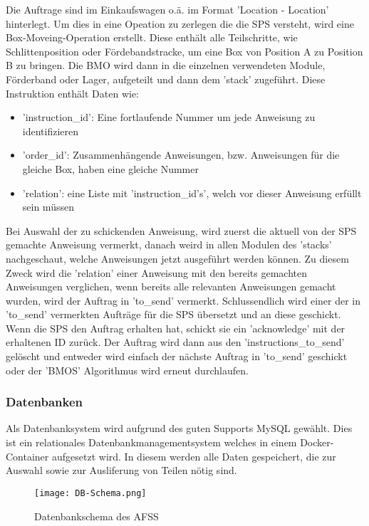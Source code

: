 Die Auftrage sind im Einkaufswagen o.ä. im Format 'Location -\> Location' hinterlegt. Um dies in eine Opeation zu zerlegen die die SPS versteht, wird eine Box-Moveing-Operation erstellt. Diese enthält alle Teilschritte, wie Schlittenposition oder Fördebandstracke, um eine Box von Position A zu Position B zu bringen. 
Die BMO wird dann in die einzelnen verwendeten Module, Förderband oder Lager, aufgeteilt und dann dem 'stack' zugeführt. Diese Instruktion enthält Daten wie:
\begin{itemize}
    \item 'instruction\_id': Eine fortlaufende Nummer um jede Anweisung zu identifizieren
    \item 'order\_id': Zusammenhängende Anweisungen, bzw. Anweisungen für die gleiche Box, haben eine gleiche Nummer
    \item 'relation': eine Liste mit 'instruction\_id's', welch vor dieser Anweisung erfüllt sein müssen
\end{itemize} 

Bei Auswahl der zu schickenden Anweisung, wird zuerst die aktuell von der SPS gemachte Anweisung vermerkt, danach weird in allen Modulen des 'stacks' nachgeschaut, welche Anweisungen jetzt ausgeführt werden können. Zu diesem Zweck wird die 'relation' einer Anweisung mit den bereits gemachten Anweisungen verglichen, wenn bereits alle relevanten Anweisungen gemacht wurden, wird der Auftrag in 'to\_send' vermerkt. Schlussendlich wird einer der in 'to\_send' vermerkten Aufträge für die SPS übersetzt und an diese geschickt. 
Wenn die SPS den Auftrag erhalten hat, schickt sie ein 'acknowledge' mit der erhaltenen ID zurück. Der Auftrag wird dann aus den 'instructions\_to\_send' gelöscht und entweder wird einfach der nächste Auftrag in 'to\_send' geschickt oder der 'BMOS' Algorithmus wird erneut durchlaufen.


\subsubsection{Datenbanken}

Als Datenbanksystem wird aufgrund des guten Supports MySQL gewählt. Dies ist ein relationales Datenbankmanagementsystem welches in einem Docker-Container aufgesetzt wird. In diesem werden alle Daten gespeichert, die zur Auswahl sowie zur Ausliferung von Teilen nötig sind.

\begin{figure}[h]
    \texttt{[image: DB-Schema.png]}
    \centering
    \caption{Datenbankschema des AFSS}
    \label{DB-Scema}
\end{figure}

